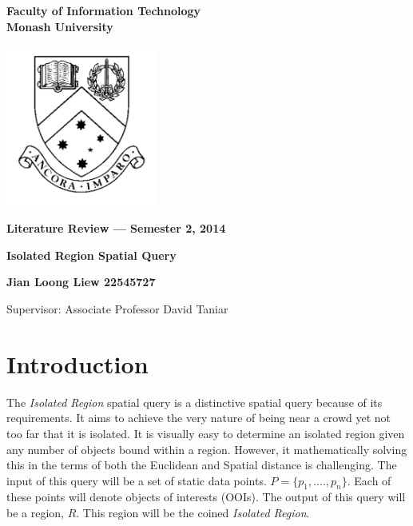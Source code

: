 \documentclass[a4paper,11pt]{article}
\begin{document}
\thispagestyle{empty} %
\renewcommand{\thepage}{\roman{page}}

\begin{spacing}{1.5}
\begin{center}
{\Large \bfseries
Faculty of Information Technology\\
Monash University}

\vspace*{30mm}

\includegraphics[width=5cm]{MonashCrest}

\vspace*{15mm}

{\large \bfseries
Literature Review --- Semester 2, 2014
}

\vspace*{10mm}

{\LARGE \bfseries
Isolated Region Spatial Query
}

\vspace*{20mm}

{\large \bfseries
Jian Loong Liew 22545727

\vspace*{20mm}

Supervisor: Associate Professor David Taniar
}

\end{center}
\end{spacing}

\newpage

\tableofcontents

\newpage
\setcounter{page}{1}
\renewcommand{\thepage}{\arabic{page}}

\section{Introduction} 

The \textit{Isolated Region} spatial query is a distinctive spatial query
because of its requirements. It aims to achieve the very nature of being near
a crowd yet not too far that it is isolated. It is visually easy to determine
an isolated region given any number of objects bound within a region. However,
it mathematically solving this in the terms of both the Euclidean and Spatial
distance is challenging. The input of this query will be a set of static data
points. $P=\{p_1,....,p_n\}$. Each of these points will denote objects of
interests (OOIs). The output of this query will be a region, $R$. This region
will be the coined \textit{Isolated Region}.
\end{document}
